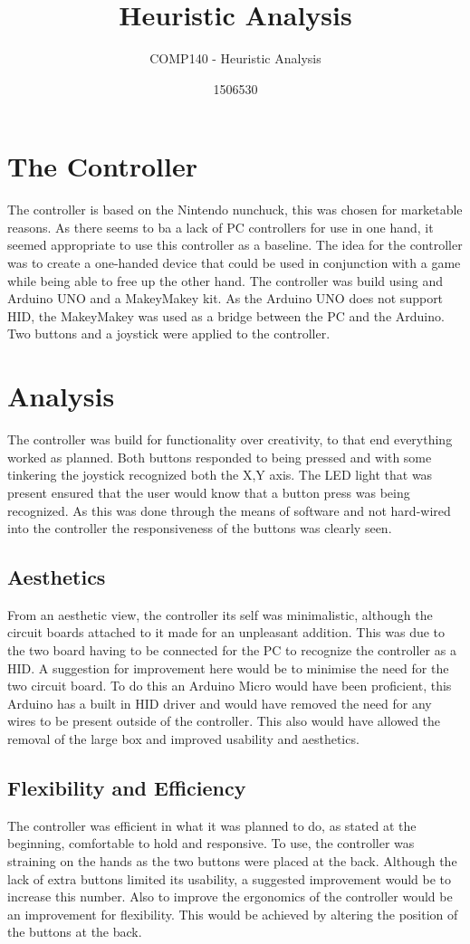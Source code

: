 \documentclass{scrartcl}
\title{Heuristic Analysis}
\subtitle{COMP140 - Heuristic Analysis}
\author{1506530}
\begin{document}
\maketitle

\section{The Controller}
The controller is based on the Nintendo nunchuck, this was chosen for marketable reasons. As there seems to ba a lack of PC controllers for use in one hand, it seemed appropriate to use this controller as a baseline. The idea for the controller was to create a one-handed device that could be used in conjunction with a game while being able to free up the other hand. The controller was build using and Arduino UNO and a MakeyMakey kit. As the Arduino UNO does not support HID, the MakeyMakey was used as a bridge between the PC and the Arduino. Two buttons and a joystick were applied to the controller.

\section{Analysis}
The controller was build for functionality over creativity, to that end everything worked as planned. Both buttons responded to being pressed and with some tinkering the joystick recognized both the X,Y axis. The LED light that was present ensured that the user would know that a button press was being recognized. As this was done through the means of software and not hard-wired into the controller the responsiveness of the buttons was clearly seen. 

\subsection{Aesthetics}
From an aesthetic view, the controller its self was minimalistic, although the circuit boards attached to it made for an unpleasant addition. This was due to the two board having to be connected for the PC to recognize the controller as a HID. A suggestion for improvement here would be to minimise the need for the two circuit board. To do this an Arduino Micro would have been proficient, this Arduino has a built in HID driver and would have removed the need for any wires to be present outside of the controller. This also would have allowed the removal of the large box and improved usability and aesthetics.

\subsection{Flexibility and Efficiency}
The controller was efficient in what it was planned to do, as stated at the beginning, comfortable to hold and responsive. To use, the controller was straining on the hands as the two buttons were placed at the back. Although the lack of extra buttons limited its usability, a suggested improvement would be to increase this number. Also to improve the ergonomics of the controller would be an improvement for flexibility. This would be achieved by altering the position of the buttons at the back.



\end{document}
